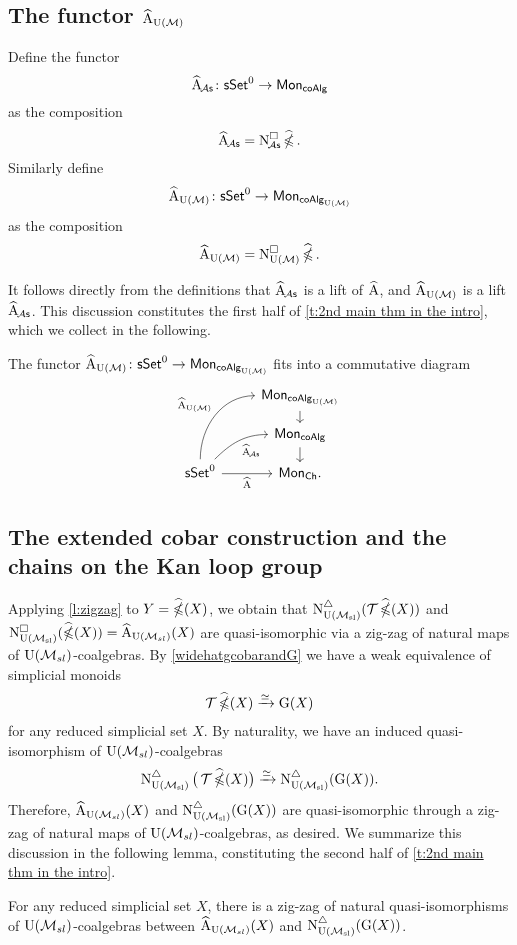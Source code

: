 \subsection{The functor $\adamsE_{\UM}$} \label{s:ahatum}

Define the functor
\[
\adamsEA \colon \sSet^0 \to \Mon_{\coAlg}
\]
as the composition
\[
\adamsEA = \cchainsA \ccobarE.
\]
Similarly define
\[
\adamsE_{\UM} \colon \sSet^0 \to \Mon_{\coAlg_{\UM}}
\]
as the composition
\[
\adamsE_{\UM} = \cchainsUM \ccobarE.
\]

It follows directly from the definitions that $\adamsEA$ is a lift of $\adamsE$, and $\adamsE_{\UM}$ is a lift $\adamsEA$.
This discussion constitutes the first half of \cref{t:2nd main thm in the intro}, which we collect in the following.

\begin{lemma} \label{l:AhatUM}
	The functor $\adamsEUM \colon \sSet^0 \to \Mon_{\coAlg_\UM}$ fits into a commutative diagram
	\[
	\begin{tikzcd}[row sep=small]
		& \Mon_{\coAlg_\UM} \arrow[d] \\
		& \Mon_{\coAlg} \arrow[d] \\
		\sSet^0
		\arrow[r, "\adamsE"', ]
		\arrow[ru, "\adamsEA"', out=45, in=180]
		\arrow[ruu, "\adamsEUM", out=90, in=180]
		& \Mon_{\Ch}.
	\end{tikzcd}
	\]
\end{lemma}


\subsection{The extended cobar construction and the chains on the Kan loop group}

Applying \cref{l:zigzag} to $Y = \ccobarE(X)$, we obtain that $\schainsUSL (\triangulate \ccobarE(X))$ and $\cchainsUSL(\ccobarE(X)) = \adamsE_{\USL}(X)$ are quasi-isomorphic via a zig-zag of natural maps of $\USL$-coalgebras.
By \cref{widehatgcobarandG} we have a weak equivalence of simplicial monoids
\[
\triangulate \ccobarE(X) \xrightarrow{\simeq} \kan(X)
\]
for any reduced simplicial set $X$.
By naturality, we have an induced quasi-isomorphism of $\USL$-coalgebras
\[
\schainsUSL \big( \triangulate \ccobarE(X) \big) \xra{\simeq}
\schainsUSL (\kan(X)).
\]
Therefore, $\adamsE_{\USL}(X)$ and $\schainsUSL(\kan(X))$ are quasi-isomorphic through a zig-zag of natural maps of $\USL$-coalgebras, as desired.
We summarize this discussion in the following lemma, constituting the second half of \cref{t:2nd main thm in the intro}.

\begin{lemma}\label{l:AhatandGX}
	For any reduced simplicial set $X$, there is a zig-zag of natural quasi-isomorphisms of $\USL$-coalgebras between $\adamsE_\USL(X)$ and $\schainsUSL(\kan(X))$.
\end{lemma}